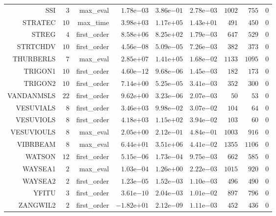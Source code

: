 \begin{longtable}{rrrrrrrrr}
SSI & \(     3\) & max\_eval & \( 1.78\)e\(-03\) & \( 3.86\)e\(-01\) & \( 2.78\)e\(-03\) & \(  1002\) & \(   755\) & \(     0\) \\
STRATEC & \(    10\) & max\_time & \( 3.98\)e\(+03\) & \( 1.17\)e\(+05\) & \( 1.43\)e\(+01\) & \(   491\) & \(   450\) & \(     0\) \\
STREG & \(     4\) & first\_order & \( 8.58\)e\(+06\) & \( 8.25\)e\(+02\) & \( 1.79\)e\(-03\) & \(   647\) & \(   529\) & \(     0\) \\
STRTCHDV & \(    10\) & first\_order & \( 4.56\)e\(-08\) & \( 5.09\)e\(-05\) & \( 7.26\)e\(-03\) & \(   382\) & \(   373\) & \(     0\) \\
THURBERLS & \(     7\) & max\_eval & \( 2.85\)e\(+07\) & \( 1.41\)e\(+05\) & \( 1.68\)e\(-02\) & \(  1133\) & \(  1095\) & \(     0\) \\
TRIGON1 & \(    10\) & first\_order & \( 4.60\)e\(-12\) & \( 9.68\)e\(-06\) & \( 1.45\)e\(-03\) & \(   182\) & \(   173\) & \(     0\) \\
TRIGON2 & \(    10\) & first\_order & \( 7.14\)e\(+00\) & \( 5.25\)e\(-05\) & \( 3.41\)e\(-03\) & \(   352\) & \(   300\) & \(     0\) \\
VANDANMSLS & \(    22\) & first\_order & \( 9.62\)e\(+00\) & \( 3.23\)e\(-06\) & \( 2.07\)e\(-03\) & \(    50\) & \(    53\) & \(     0\) \\
VESUVIALS & \(     8\) & first\_order & \( 3.46\)e\(+03\) & \( 9.98\)e\(-02\) & \( 3.07\)e\(-02\) & \(   104\) & \(    64\) & \(     0\) \\
VESUVIOLS & \(     8\) & first\_order & \( 4.18\)e\(+03\) & \( 1.15\)e\(+02\) & \( 3.94\)e\(-02\) & \(   103\) & \(    60\) & \(     0\) \\
VESUVIOULS & \(     8\) & max\_eval & \( 2.05\)e\(+00\) & \( 2.12\)e\(-01\) & \( 4.84\)e\(-01\) & \(  1003\) & \(   916\) & \(     0\) \\
VIBRBEAM & \(     8\) & max\_eval & \( 6.44\)e\(+01\) & \( 3.51\)e\(+06\) & \( 4.41\)e\(-02\) & \(  1355\) & \(  1106\) & \(     0\) \\
WATSON & \(    12\) & first\_order & \( 5.15\)e\(-06\) & \( 1.73\)e\(-04\) & \( 9.75\)e\(-03\) & \(   662\) & \(   585\) & \(     0\) \\
WAYSEA1 & \(     2\) & max\_eval & \( 1.03\)e\(-04\) & \( 1.26\)e\(+00\) & \( 2.22\)e\(-03\) & \(  1015\) & \(   920\) & \(     0\) \\
WAYSEA2 & \(     2\) & first\_order & \( 1.23\)e\(-05\) & \( 1.52\)e\(-03\) & \( 1.10\)e\(-03\) & \(   496\) & \(   490\) & \(     0\) \\
YFITU & \(     3\) & first\_order & \( 3.61\)e\(-10\) & \( 2.04\)e\(-03\) & \( 1.01\)e\(-02\) & \(   897\) & \(   796\) & \(     0\) \\
ZANGWIL2 & \(     2\) & first\_order & \(-1.82\)e\(+01\) & \( 2.12\)e\(-09\) & \( 1.11\)e\(-03\) & \(   452\) & \(   436\) & \(     0\) \\\hline
\end{longtable}
